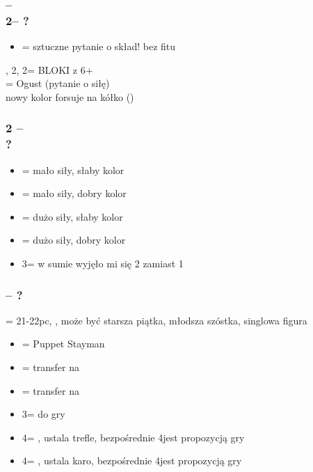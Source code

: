 \documentclass[12pt, a4paper]{article}
\begin{document}
\subsubsection*{\alrts{2\clubs} -- \alrts{2\diams}\\
                2\hearts -- ?}
\begin{itemize}
    \item \alrts{2\spades} = sztuczne pytanie o skład! bez fitu
\end{itemize}

\vspace{0.3cm}

\alrts{2\diams}, 2\hearts, 2\spades = BLOKI z 6+\\
\alrts{2\nt} = Ogust (pytanie o siłę)\\
nowy kolor forsuje na kółko (\fonce)

\subsubsection*{2 -- \alrts{2\nt}\\
                ?}
\begin{itemize}
    \item \alrts{3\clubs} = mało siły, słaby kolor
    \item \alrts{3\diams} = mało siły, dobry kolor
    \item \alrts{3\hearts} = dużo siły, słaby kolor
    \item \alrts{3\spades} = dużo siły, dobry kolor
    \item 3\nt = w sumie wyjęło mi się 2 zamiast 1
\end{itemize}

\subsubsection*{\alrts{2\nt} -- ?}
\alrts{2\nt} = 21-22pc, \bal, może być starsza piątka, młodsza szóstka, singlowa figura\\
\begin{itemize}
    \item \alrts{3\clubs} = Puppet Stayman
    \item \alrts{3\diams} = transfer na \hearts
    \item \alrts{3\hearts} = transfer na \spades
    \item 3\nt = do gry
    \item 4\clubs = \gf, ustala trefle, bezpośrednie 4\nt jest propozycją gry
    \item 4\diams = \gf, ustala karo, bezpośrednie 4\nt jest propozycją gry
\end{itemize}
\end{document}
